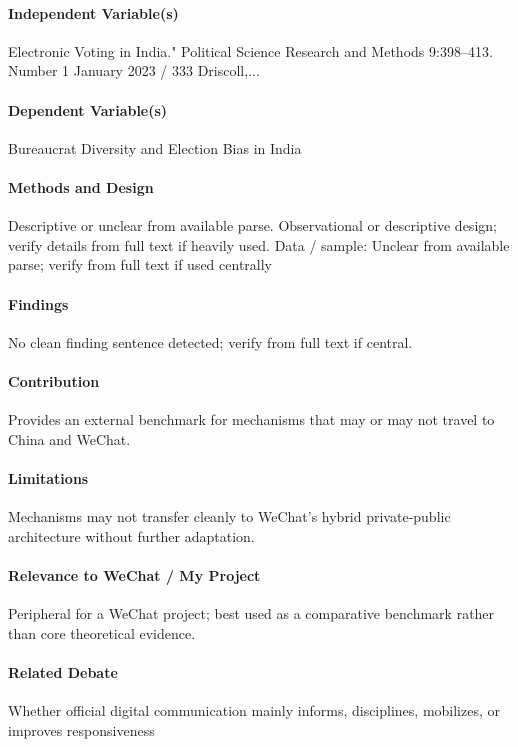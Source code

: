 \documentclass[12pt]{article}
\begin{document}
\paragraph{Independent Variable(s)} Electronic Voting in India." Political Science Research and Methods 9:398--413. Number 1 January 2023 / 333 Driscoll,...

\paragraph{Dependent Variable(s)} Bureaucrat Diversity and Election Bias in India

\paragraph{Methods and Design} Descriptive or unclear from available parse. Observational or descriptive design; verify details from full text if heavily used. Data / sample: Unclear from available parse; verify from full text if used centrally

\paragraph{Findings} No clean finding sentence detected; verify from full text if central.

\paragraph{Contribution} Provides an external benchmark for mechanisms that may or may not travel to China and WeChat.

\paragraph{Limitations} Mechanisms may not transfer cleanly to WeChat's hybrid private-public architecture without further adaptation.

\paragraph{Relevance to WeChat / My Project} Peripheral for a WeChat project; best used as a comparative benchmark rather than core theoretical evidence.

\paragraph{Related Debate} Whether official digital communication mainly informs, disciplines, mobilizes, or improves responsiveness
\end{document}
